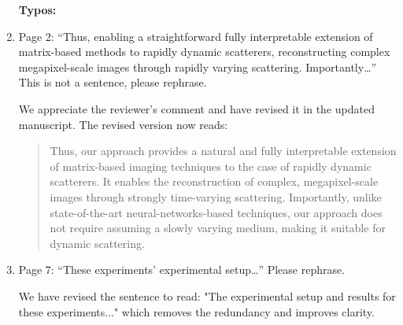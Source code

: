 \documentclass[12pt]{article}
\newenvironment{solved_reviewercomment}
    {\begin{tcolorbox}[width=\linewidth,colback=gray!5,colframe=solved_commentcolor!50,title=Reviewer Comment,left=5pt,right=5pt]}
    {\end{tcolorbox}}
\newenvironment{ourresponse}
    {\begin{tcolorbox}[width=\linewidth,breakable,enhanced,colback=gray!5,colframe=responsecolor!50,title=Response,left=5pt,right=5pt]}
    {\end{tcolorbox}}
\begin{document}
\begin{enumerate}[label=\arabic*.]
\begin{ourresponse}

\end{ourresponse}



\textbf{Typos:}

\item  \leavevmode\vspace{-\baselineskip}
\begin{solved_reviewercomment}
    Page 2: “Thus, enabling a straightforward fully interpretable extension of matrix-based methods to rapidly dynamic scatterers, reconstructing complex megapixel-scale images through rapidly varying scattering. Importantly…” This is not a sentence, please rephrase.
\end{solved_reviewercomment}

\begin{ourresponse}
    We appreciate the reviewer’s comment and have revised it in the updated manuscript. The revised version now reads:
    
    \begin{quote}
        Thus, our approach provides a natural and fully interpretable extension of matrix-based imaging techniques to the case of rapidly dynamic scatterers. It enables the reconstruction of complex, megapixel-scale images through strongly time-varying scattering. Importantly, unlike state-of-the-art neural-networks-based techniques, our approach does not require assuming a slowly varying medium, making it suitable for dynamic scattering.
    \end{quote}
    
\end{ourresponse}



\item  \leavevmode\vspace{-\baselineskip}
\begin{solved_reviewercomment}
    Page 7: “These experiments’ experimental setup…” Please rephrase.
\end{solved_reviewercomment}

\begin{ourresponse}
    We have revised the sentence to read: "The experimental setup and results for these experiments..." which removes the redundancy and improves clarity.
\end{ourresponse}

\end{enumerate}
\end{document}
